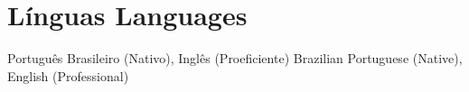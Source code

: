 \section{
    {Línguas}
    {Languages}
  }
  \vspace{2pt}
  \resumeSubHeadingListStart
    \small{\item{%
        {Português Brasileiro (Nativo), Inglês (Proeficiente)}%
        {Brazilian Portuguese (Native), English (Professional)}
      }
    }{}
  \resumeSubHeadingListEnd
